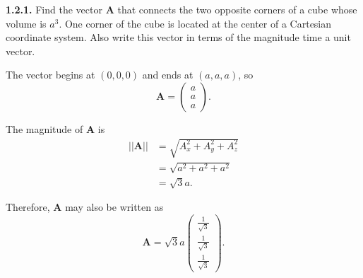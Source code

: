 \documentclass{article}
\begin{document}
\textbf{1.2.1.} Find the vector $\mathbf{A}$ that connects the two opposite corners of a cube whose volume is $a^3$. One
corner of the cube is located at the center of a Cartesian coordinate system. Also write this vector in terms of the
magnitude time a unit vector.

\vspace{24pt}

The vector begins at $(0,0,0)$ and ends at $(a,a,a)$, so \[\mathbf{A} = \begin{pmatrix} a \\ a \\ a \end{pmatrix}.\]

The magnitude of $\mathbf{A}$ is
\begin{equation*}
	\begin{split}
		||\mathbf{A}|| & = \sqrt{A_x^2 + A_y^2 + A_z^2} \\
		& = \sqrt{a^2 + a^2 + a^2} \\
		& = \sqrt{3}a.
	\end{split}
\end{equation*}

Therefore, $\mathbf{A}$ may also be written as \[\mathbf{A} = \sqrt{3}a \begin{pmatrix} \frac{1}{\sqrt{3}} \\
		\frac{1}{\sqrt{3}} \\ \frac{1}{\sqrt{3}}\end{pmatrix}.\]
\end{document}
